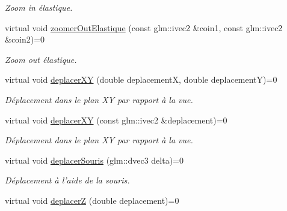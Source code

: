 \begin{DoxyCompactItemize}
\begin{DoxyCompactList}\small\item\em Zoom in élastique. \end{DoxyCompactList}\item 
\hypertarget{classvue_1_1_vue_a7f2121399c50dbec8db7a8d8fab78ddc}{virtual void \hyperlink{classvue_1_1_vue_a7f2121399c50dbec8db7a8d8fab78ddc}{zoomer\-Out\-Elastique} (const glm\-::ivec2 \&coin1, const glm\-::ivec2 \&coin2)=0}\label{classvue_1_1_vue_a7f2121399c50dbec8db7a8d8fab78ddc}

\begin{DoxyCompactList}\small\item\em Zoom out élastique. \end{DoxyCompactList}\item 
\hypertarget{classvue_1_1_vue_a8e4dec26a65250ec721b044333bf62ce}{virtual void \hyperlink{classvue_1_1_vue_a8e4dec26a65250ec721b044333bf62ce}{deplacer\-X\-Y} (double deplacement\-X, double deplacement\-Y)=0}\label{classvue_1_1_vue_a8e4dec26a65250ec721b044333bf62ce}

\begin{DoxyCompactList}\small\item\em Déplacement dans le plan X\-Y par rapport à la vue. \end{DoxyCompactList}\item 
\hypertarget{classvue_1_1_vue_a4019b90a0a76ca3eb3633dda3bcb397a}{virtual void \hyperlink{classvue_1_1_vue_a4019b90a0a76ca3eb3633dda3bcb397a}{deplacer\-X\-Y} (const glm\-::ivec2 \&deplacement)=0}\label{classvue_1_1_vue_a4019b90a0a76ca3eb3633dda3bcb397a}

\begin{DoxyCompactList}\small\item\em Déplacement dans le plan X\-Y par rapport à la vue. \end{DoxyCompactList}\item 
\hypertarget{classvue_1_1_vue_a83980af768951ef5a27dabd4e6974284}{virtual void \hyperlink{classvue_1_1_vue_a83980af768951ef5a27dabd4e6974284}{deplacer\-Souris} (glm\-::dvec3 delta)=0}\label{classvue_1_1_vue_a83980af768951ef5a27dabd4e6974284}

\begin{DoxyCompactList}\small\item\em Déplacement à l'aide de la souris. \end{DoxyCompactList}\item 
\hypertarget{classvue_1_1_vue_aa54f93fe75f0df62893e7f92f1466a33}{virtual void \hyperlink{classvue_1_1_vue_aa54f93fe75f0df62893e7f92f1466a33}{deplacer\-Z} (double deplacement)=0}\label{classvue_1_1_vue_aa54f93fe75f0df62893e7f92f1466a33}


\end{DoxyCompactItemize}
